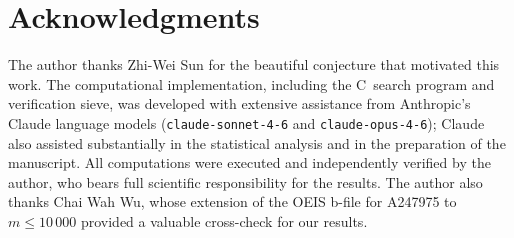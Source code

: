\documentclass[12pt]{article}
\begin{document}
\section*{Acknowledgments}

The author thanks Zhi-Wei Sun for the beautiful conjecture that
motivated this work.
The computational implementation, including the C~search program and
verification sieve, was developed with extensive assistance from
Anthropic's Claude language models (\texttt{claude-sonnet-4-6} and
\texttt{claude-opus-4-6}); Claude also assisted substantially in the
statistical analysis and in the preparation of the manuscript.
All computations were executed and independently verified by the author,
who bears full scientific responsibility for the results.
The author also thanks Chai Wah Wu, whose extension of the OEIS b-file
for A247975 to $m \leq 10\,000$ provided a valuable cross-check for
our results.
\end{document}
